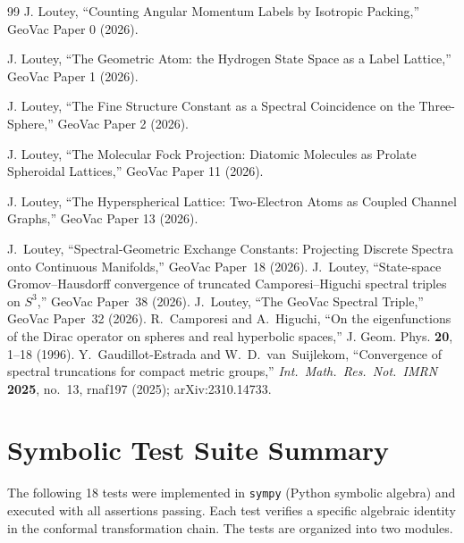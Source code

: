 \documentclass[aps,pra,twocolumn,superscriptaddress,longbibliography]{revtex4-2}
\begin{document}
\begin{thebibliography}{99}
J. Loutey,
``Counting Angular Momentum Labels by Isotropic Packing,''
GeoVac Paper 0 (2026).

J. Loutey,
``The Geometric Atom: the Hydrogen State Space as a Label Lattice,''
GeoVac Paper 1 (2026).

J. Loutey,
``The Fine Structure Constant as a Spectral Coincidence on the
Three-Sphere,''
GeoVac Paper 2 (2026).

J. Loutey,
``The Molecular Fock Projection: Diatomic Molecules as Prolate
Spheroidal Lattices,''
GeoVac Paper 11 (2026).

J. Loutey,
``The Hyperspherical Lattice: Two-Electron Atoms as Coupled Channel
Graphs,''
GeoVac Paper 13 (2026).

J.~Loutey,
``Spectral-Geometric Exchange Constants: Projecting Discrete Spectra onto Continuous Manifolds,''
GeoVac Paper~18 (2026).
J.~Loutey,
``State-space Gromov--Hausdorff convergence of truncated Camporesi--Higuchi spectral triples on $S^3$,''
GeoVac Paper~38 (2026).
J.~Loutey,
``The GeoVac Spectral Triple,''
GeoVac Paper~32 (2026).
R.~Camporesi and A.~Higuchi,
``On the eigenfunctions of the Dirac operator on spheres and real hyperbolic spaces,''
J. Geom. Phys. \textbf{20}, 1--18 (1996).
Y.~Gaudillot-Estrada and W.~D.~van~Suijlekom,
``Convergence of spectral truncations for compact metric groups,''
\textit{Int.~Math.~Res.~Not.\ IMRN} \textbf{2025}, no.~13, rnaf197 (2025); arXiv:2310.14733.

\end{thebibliography}


\appendix

\section{Symbolic Test Suite Summary}
\label{app:tests}

The following 18 tests were implemented in \texttt{sympy} (Python symbolic algebra) and executed with all assertions passing. Each test verifies a specific algebraic identity in the conformal transformation chain. The tests are organized into two modules.
\end{document}

